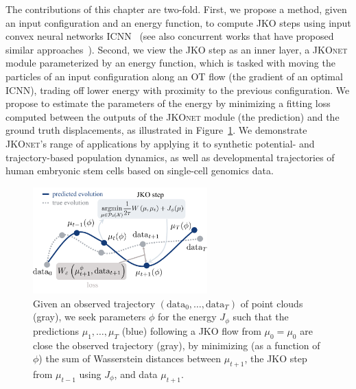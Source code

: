 The contributions of this chapter are two-fold. First, we propose a method, given an input configuration and an energy function, to compute \acrshort{JKO} steps using input convex neural networks \acrlong{ICNN}~\citep{amos2017input,makkuva2020optimal} (see also concurrent works that have proposed similar approaches~\citep{alvarez2021optimizing, mokrov2021large}). Second, we view the \acrshort{JKO} step as an inner layer, a \textsc{JKOnet} module parameterized by an energy function, which is tasked with moving the particles of an input configuration along an OT flow (the gradient of an optimal \acrshort{ICNN}), trading off lower energy with proximity to the previous configuration.
We propose to estimate the parameters of the energy by minimizing a fitting loss %
computed between the outputs of the \textsc{JKOnet} module (the prediction) and the ground truth displacements, as illustrated in Figure~\ref{fig:overview_jkonet}.
We demonstrate \textsc{JKOnet}'s range of applications by applying it to synthetic potential- and trajectory-based population dynamics, as well as developmental trajectories of human embryonic stem cells based on single-cell genomics data.

\begin{figure}[t]
    \centering
    \includegraphics[width=0.6\textwidth]{figures/fig_overview_jkonet.pdf}
    \caption{Given an observed trajectory $(\mathrm{data}_0,\dots,\mathrm{data}_T)$ of point clouds (gray), we seek parameters $\phi$ for the energy $J_\phi$ such that the predictions $\mu_1, \dots, \mu_T$ (blue) following a \acrshort{JKO} flow from $\mu_0=\mu_0$ are close the observed trajectory (gray), by minimizing (as a function of $\phi$) the sum of Wasserstein distances between $\mu_{t+1}$, the \acrshort{JKO} step from $\mu_{t-1}$ using $J_\phi$, and data $\mu_{t+1}$.}
    \label{fig:overview_jkonet}
\end{figure}


